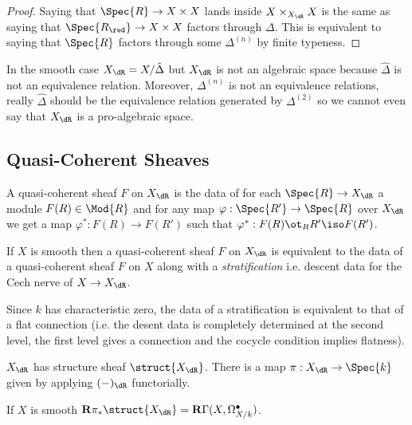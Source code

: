 \documentclass[12pt]{article}
\begin{document}
\begin{proof}
Saying that $\Spec{R} \to X \times X$ lands inside $X \times_{X_{\dR}} X$ is the same as saying that $\Spec{R_{\red}} \to X \times X$ factors through $\Delta$. This is equivalent to saying that $\Spec{R}$ factors through some $\Delta^{(n)}$ by finite typeness. 
\end{proof}

\begin{rmk}
In the smooth case $X_{\dR} = X / \hat{\Delta}$ but $X_{\dR}$ is not an algebraic space because $\hat{\Delta}$ is not an \etale equivalence relation. Moreover, $\Delta^{(n)}$ is not an equivalence relations, really $\hat{\Delta}$ should be the equivalence relation generated by $\Delta^{(2)}$ so we cannot even say that $X_{\dR}$ is a pro-algebraic space.
\end{rmk}

\subsection{Quasi-Coherent Sheaves}

A quasi-coherent sheaf $F$ on $X_{\dR}$ is the data of for each $\Spec{R} \to X_{\dR}$ a module $F(R) \in \Mod{R}$ and for any map $\varphi : \Spec{R'} \to \Spec{R}$ over $X_{\dR}$ we get a map $\varphi^* : F(R) \to F(R')$ such that $\varphi^* : F(R) \ot_R R' \iso F(R')$.

\begin{prop}
If $X$ is smooth then a quasi-coherent sheaf $F$ on $X_{\dR}$ is equivalent to the data of a quasi-coherent sheaf $F$ on $X$ along with a \textit{stratification} i.e. descent data for the Cech nerve of $X \to X_{\dR}$. 
\end{prop}

\begin{prop}
Since $k$ has characteristic zero, the data of a stratification is equivalent to that of a flat connection (i.e. the desent data is completely determined at the second level, the first level gives a connection and the cocycle condition implies flatness). 
\end{prop}

\begin{rmk}
$X_{\dR}$ has structure sheaf $\struct{X_{\dR}}$. There is a map $\pi : X_{\dR} \to \Spec{k}$ given by applying $(-)_{\dR}$ functorially.
\end{rmk}

\begin{theorem}
If $X$ is smooth $\R \pi_* \struct{X_{\dR}} = \R \Gamma(X, \Omega^\bullet_{X/k})$.
\end{theorem}
\end{document}
